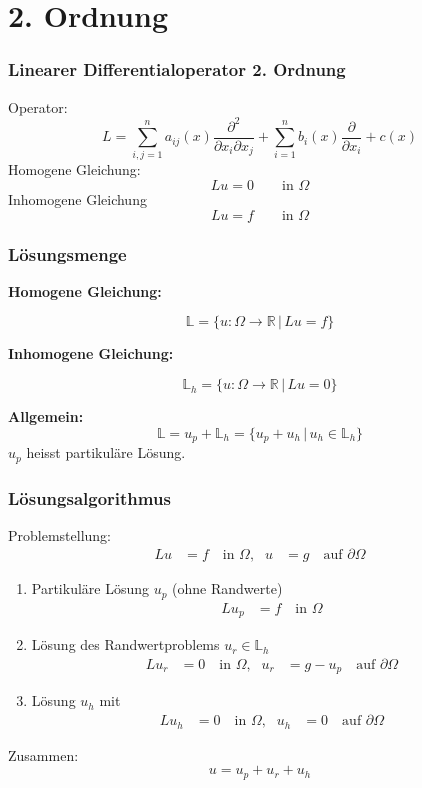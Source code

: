 
\section{2. Ordnung}

\begin{frame}
\frametitle{Linearer Differentialoperator 2. Ordnung}
Operator:
\[
L
=
\sum_{i,j=1}^n a_{ij}(x)\frac{\partial^2}{\partial x_i\partial x_j}
+
\sum_{i=1}^n b_i(x)\frac{\partial}{\partial x_i}
+
c(x)
\]
Homogene Gleichung:
\[
Lu=0\qquad\text{in $\Omega$}
\]
Inhomogene Gleichung
\[
Lu=f\qquad\text{in $\Omega$}
\]
\end{frame}

\begin{frame}
\frametitle{Lösungsmenge}
{\bf Homogene Gleichung:}

\[
{\mathbb L}
=\{
u\colon \Omega\to \mathbb R\,|\, Lu=f
\}
\]

\bigskip

{\bf Inhomogene Gleichung:}

\[
{\mathbb L}_h
=\{
u\colon \Omega\to \mathbb R\,|\, Lu=0
\}
\]

{\bf Allgemein:}
\[
{\mathbb L} = u_p + {\mathbb L}_h
=\{u_p+u_h\,|\,u_h\in\mathbb L_h\}
\]
$u_p$ heisst partikuläre Lösung.

\end{frame}

\begin{frame}
\frametitle{Lösungsalgorithmus}
Problemstellung:
\begin{align*}
Lu&=f\quad\text{in $\Omega$,}
&
 u&=g\quad\text{auf $\partial\Omega$}
\end{align*}

\begin{enumerate}
\item Partikuläre Lösung $u_p$ (ohne Randwerte)
\begin{align*}
Lu_p&=f\quad\text{in $\Omega$}
\end{align*}
\item
Lösung des Randwertproblems $u_r\in\mathbb L_h$
\begin{align*}
Lu_r&=0    \quad\text{in $\Omega$,}&
 u_r&=g-u_p\quad\text{auf $\partial\Omega$}
\end{align*}
\item
Lösung $u_h$ mit
\begin{align*}
Lu_h&=0\quad\text{in $\Omega$,}
&
 u_h&=0\quad\text{auf $\partial\Omega$}
\end{align*}
\end{enumerate}
Zusammen:
\[
u = u_p+u_r+u_h
\]
\end{frame}

